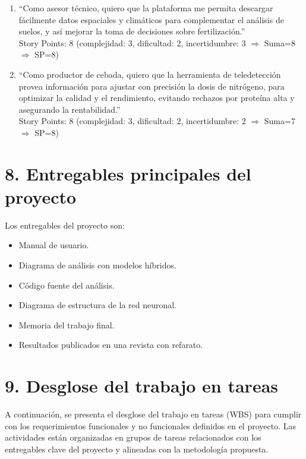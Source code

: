 \documentclass[
11pt, %
]{charter}
\begin{document}
\begin{enumerate}
    \item “Como asesor técnico, quiero que la plataforma me permita descargar fácilmente datos espaciales y climáticos para complementar el análisis de suelos, y así mejorar la toma de decisiones sobre fertilización.”\\ 
    Story Points: 8 (complejidad: 3, dificultad: 2, incertidumbre: 3 $\Rightarrow$ Suma=8 $\Rightarrow$ SP=8)

    \item “Como productor de cebada, quiero que la herramienta de teledetección provea información para ajustar con precisión la dosis de nitrógeno, para optimizar la calidad y el rendimiento, evitando rechazos por proteína alta y asegurando la rentabilidad.”\\
    Story Points: 8 (complejidad: 3, dificultad: 2, incertidumbre: 2 $\Rightarrow$ Suma=7 $\Rightarrow$ SP=8)
\end{enumerate}


\pagebreak

\section{8. Entregables principales del proyecto}
\label{sec:entregables}

Los entregables del proyecto son:

\begin{itemize}
	\item Manual de usuario.
	\item Diagrama de análisis con modelos híbridos.
	\item Código fuente del análisis.
	\item Diagrama de estructura de la red neuronal.
	\item Memoria del trabajo final.
	\item Resultados publicados en una revista con refarato.
\end{itemize}


\section{9. Desglose del trabajo en tareas}
\label{sec:wbs}

A continuación, se presenta el desglose del trabajo en tareas (WBS) para cumplir con los requerimientos funcionales y no funcionales definidos en el proyecto. Las actividades están organizadas en grupos de tareas relacionados con los entregables clave del proyecto y alineadas con la metodología propuesta.
\end{document}
